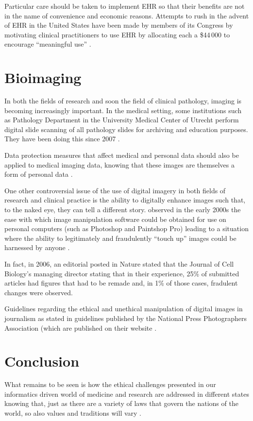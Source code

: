 \documentclass[british,a4paper, 12pt]{article}
\begin{document}
Particular care should be taken to implement EHR so that their benefits are not in the 
name of convenience and economic reasons. Attempts to rush in the advent of EHR in the 
United States have been made by members of its Congress by motivating clinical 
practitioners to use EHR  by allocating each a \$44\,000 to encourage ``meaningful use'' 
\cite{jha2010meaningful}. 

\section{Bioimaging}
In both the fields of research and soon the field of clinical pathology, imaging is becoming 
increasingly important. In the medical setting, some institutions such as Pathology Department 
in the University Medical Center of Utrecht perform digital slide scanning of all pathology 
slides for archiving and education purposes. They have been doing this since 2007
\parencite{stathonikos2013going}.

Data protection measures that affect medical and personal data should also be 
applied to medical imaging data, knowing that these images are themselves a form 
of personal data \parencite{duquenoy2008considering}.

One other controversial issue of the use of digital imagery in both fields of research and 
clinical practice is the ability to digitally enhance images such that, to the naked eye, they 
can tell a different story. \citeauthor*{cutrone2001true} observed in the early 2000s the ease 
with which image manipulation software could be obtained for use on personal computers  (such as 
Photoshop and Paintshop Pro) leading to a situation where the ability to legitimately and 
fraudulently ``touch up'' images could be harnessed by anyone \parencite{cutrone2001true}.

In fact, in 2006, an editorial posted in Nature stated that the Journal of Cell Biology's
managing director stating that in their experience, 25\% of submitted articles had figures that
had to be remade and, in 1\% of those cases, fradulent changes were observed. %


Guidelines regarding the ethical and unethical manipulation of digital images in journalism as
stated in guidelines published by the National Press Photographers Association (which are
published on their website \parencite{national2012ethics}.


\section{Conclusion}

What remains to be seen is how the ethical challenges presented in our informatics driven
world of medicine and research are addressed in different states knowing that, just as there
are a variety of laws that govern the nations of the world, so also values and traditions will
vary \cite{kluge2000professional}.


\printbibliography
\end{document}
